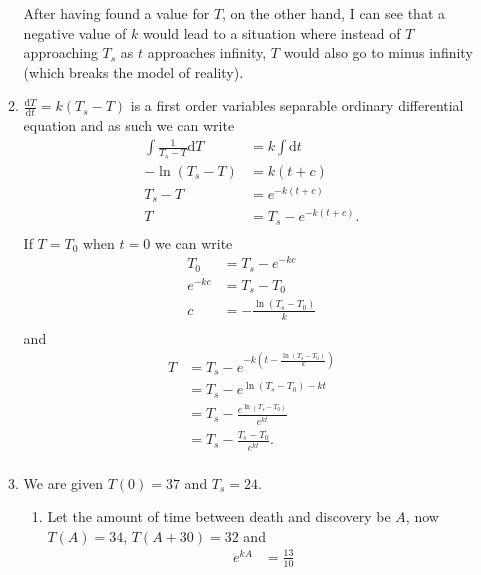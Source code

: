\documentclass[10pt]{article}
\newcommand*{\dt}[0]{\text{d}t}
\newcommand*{\dT}[0]{\text{d}T}
\newcommand*{\df}[2]{\frac{\text{d}{#1}}{\text{d}{#2}}}%
\begin{document}
\begin{enumerate}
\begin{enumerate}
                After having found a value for $T$, on the other hand, I can
                see that a negative value of $k$ would lead to a situation
                where instead of $T$ approaching $T_s$ as $t$ approaches
                infinity, $T$ would also go to minus infinity (which breaks the
                model of reality).
            \item $\df{T}{t} = k(T_s - T)$ is a first order variables separable
                ordinary differential equation and as such we can write
                \begin{align*}
                    \int\frac{1}{T_s - T}\dT &= k\int \dt \\
                    -\ln(T_s - T)&= k(t + c)  \\
                    T_s - T &=  e^{-k(t + c)}\\
                    T &= T_s - e^{-k(t+c)}. \\
                \end{align*}
            If $T = T_0$ when $t = 0$ we can write
                \begin{align*}
                    T_0 &= T_s - e^{-kc} \\
                    e^{-kc} &= T_s - T_0 \\
                    c &= -\frac{\ln(T_s - T_0)}{k} \\
                \end{align*}
                and
                \begin{align*}
                    T &= T_s - e^{-k\left(t-\tfrac{\ln(T_s - T_0)}{k}\right)} \\
                      &= T_s - e^{\ln(T_s - T_0)-kt} \\
                      &= T_s - \frac{e^{\ln(T_s - T_0)}}{e^{kt}} \\
                      &= T_s - \frac{T_s - T_0}{e^{kt}}. \\
                \end{align*}
            \item We are given $T(0) = 37$ and $T_s = 24$. 
                \begin{enumerate}
                    \item Let the amount of time between death and discovery be
                        $A$, now $T(A) = 34$, $T(A + 30) = 32$ and
                    \begin{align*}
                        e^{kA} &= \frac{13}{10} \\

\end{align*}
\end{enumerate}
\end{enumerate}
\end{enumerate}
\end{document}
